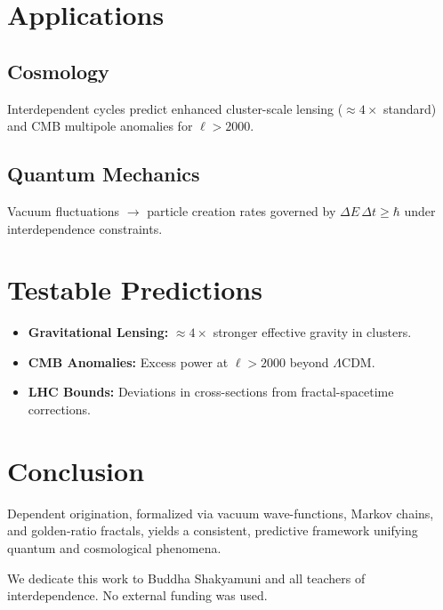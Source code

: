 \documentclass[%
  prd,
  twocolumn,
  10pt,
  nofootinbib,
  tightenlines,
  showkeys
]{revtex4-2}
\begin{document}
\section{Applications}
\subsection{Cosmology}
Interdependent cycles predict enhanced cluster-scale lensing (\(\approx4\times\) standard)
and CMB multipole anomalies for \(\ell>2000\).

\subsection{Quantum Mechanics}
Vacuum fluctuations \(\to\) particle creation rates governed by
\(\Delta E\,\Delta t\ge\hbar\) under interdependence constraints.

\section{Testable Predictions}
\begin{itemize}
  \item \textbf{Gravitational Lensing:} \(\approx4\times\) stronger effective gravity in clusters.
  \item \textbf{CMB Anomalies:} Excess power at \(\ell>2000\) beyond \(\Lambda\)CDM.
  \item \textbf{LHC Bounds:} Deviations in cross-sections from fractal-spacetime corrections.
\end{itemize}

\section{Conclusion}
Dependent origination, formalized via vacuum wave-functions, Markov chains,
and golden-ratio fractals, yields a consistent, predictive framework unifying
quantum and cosmological phenomena.

\begin{acknowledgments}
We dedicate this work to Buddha Shakyamuni and all teachers of interdependence.
No external funding was used.
\end{acknowledgments}
\end{document}
